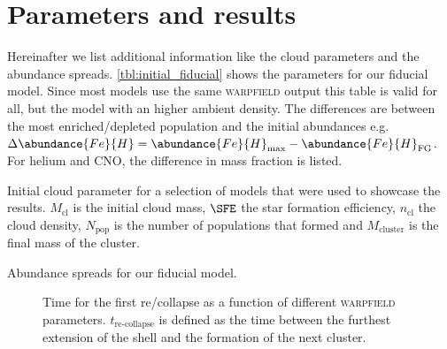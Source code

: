 \appendix

\chapter{Parameters and results}\label{sec:appendixA}

Hereinafter we list additional information like the cloud parameters and the abundance spreads. \cref{tbl:initial_fiducial} shows the parameters for our fiducial model. Since most models use the same \textsc{warpfield} output this table is valid for all, but the model with an higher ambient density. The differences are between the most enriched/depleted population and the initial abundances e.g.~$\Delta \abundance{Fe}{H} = \abundance{Fe}{H}_\text{max} - \abundance{Fe}{H}_\text{FG}$. For helium and CNO, the difference in mass fraction is listed.

\begin{table}[H]
\centering\small
\caption[Initial cloud parameters]{Initial cloud parameter for a selection of models that were used to showcase the results. $M_\text{cl}$ is the initial cloud mass, $\SFE$ the star formation efficiency, $n_\text{cl}$ the cloud density, $N_\text{pop}$ is the number of populations that formed and $M_\text{cluster}$ is the final mass of the cluster.}
\label{tbl:initial_fiducial}
\end{table}

\begin{table}[t]
\centering\small
\caption[Enrichment for fiducial model]{Abundance spreads for our fiducial model.}
\label{tbl:data_fiducial}
\end{table}


\begin{figure}[b]
\centering

\caption[Re\-/collapse time and \textsc{warpfield} parameters]{Time for the first re\-/collapse as a function of different \textsc{warpfield} parameters. $t_\text{re-collapse}$ is defined as the time between the furthest extension of the shell and the formation of the next cluster.}
\label{fig:trecollapse}
\end{figure}